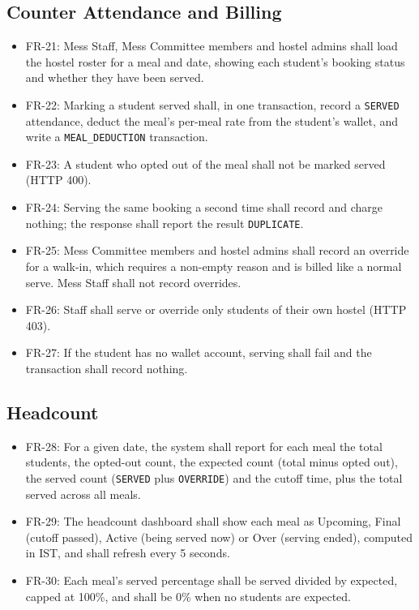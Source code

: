\documentclass{scrreprt}
\begin{document}
\subsection{Counter Attendance and Billing}
\begin{itemize}
    \item FR-21: Mess Staff, Mess Committee members and hostel admins shall
    load the hostel roster for a meal and date, showing each student's
    booking status and whether they have been served.
    \item FR-22: Marking a student served shall, in one transaction, record a
    \texttt{SERVED} attendance, deduct the meal's per-meal rate from the
    student's wallet, and write a \texttt{MEAL\_DEDUCTION} transaction.
    \item FR-23: A student who opted out of the meal shall not be marked
    served (HTTP 400).
    \item FR-24: Serving the same booking a second time shall record and
    charge nothing; the response shall report the result \texttt{DUPLICATE}.
    \item FR-25: Mess Committee members and hostel admins shall record an
    override for a walk-in, which requires a non-empty reason and is billed
    like a normal serve. Mess Staff shall not record overrides.
    \item FR-26: Staff shall serve or override only students of their own
    hostel (HTTP 403).
    \item FR-27: If the student has no wallet account, serving shall fail and
    the transaction shall record nothing.
\end{itemize}

\subsection{Headcount}
\begin{itemize}
    \item FR-28: For a given date, the system shall report for each meal the
    total students, the opted-out count, the expected count (total minus
    opted out), the served count (\texttt{SERVED} plus \texttt{OVERRIDE})
    and the cutoff time, plus the total served across all meals.
    \item FR-29: The headcount dashboard shall show each meal as Upcoming,
    Final (cutoff passed), Active (being served now) or Over (serving ended),
    computed in IST, and shall refresh every 5 seconds.
    \item FR-30: Each meal's served percentage shall be served divided by
    expected, capped at 100\%, and shall be 0\% when no students are expected.
\end{itemize}
\end{document}
